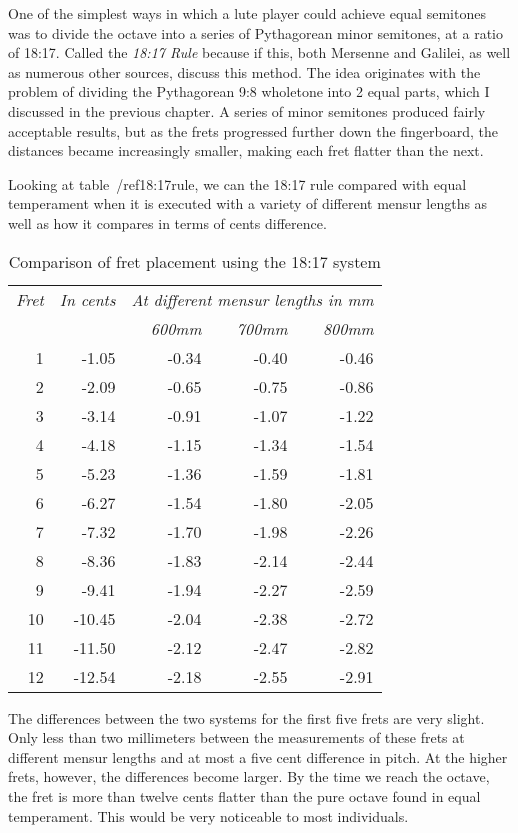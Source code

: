 One of the simplest ways in which a lute player could achieve equal semitones was to
divide the octave into a series of Pythagorean minor semitones, at a ratio of 18:17.
Called the \textit{18:17 Rule} because if this, both Mersenne and Galilei, as well as
numerous other sources, discuss this method.  The idea originates with the problem of
dividing the Pythagorean 9:8 wholetone into 2 equal parts, which I discussed in the
previous chapter.  A series of minor semitones produced fairly acceptable results, but
as the frets progressed further down the fingerboard, the distances became increasingly
smaller, making each fret flatter than the next.

Looking at table~/ref{18:17rule}, we can the 18:17 rule compared with equal temperament
when it is executed with a variety of different mensur lengths as well as how it
compares in terms of cents difference.
\begin{table}[h!]
    \begin{center}
    \begin{tabular}{ r r| r r r }
      \textit{Fret} & \textit{In cents} & \multicolumn{3}{c}{\textit{At different mensur lengths in mm}} \\
       &  & \textit{600mm} & \textit{700mm} & \textit{800mm} \\
      \hline
      1  & -1.05  & -0.34 & -0.40 & -0.46 \\
      2  & -2.09  & -0.65 & -0.75 & -0.86 \\
      3  & -3.14  & -0.91 & -1.07 & -1.22 \\
      4  & -4.18  & -1.15 & -1.34 & -1.54 \\
      5  & -5.23  & -1.36 & -1.59 & -1.81 \\
      6  & -6.27  & -1.54 & -1.80 & -2.05 \\
      7  & -7.32  & -1.70 & -1.98 & -2.26 \\
      8  & -8.36  & -1.83 & -2.14 & -2.44 \\
      9  & -9.41  & -1.94 & -2.27 & -2.59 \\
      10 & -10.45 & -2.04 & -2.38 & -2.72 \\
      11 & -11.50 & -2.12 & -2.47 & -2.82 \\
      12 & -12.54 & -2.18 & -2.55 & -2.91 \\
    \end{tabular}
    \end{center}
    \caption{Comparison of fret placement using the 18:17 system}
    \label{18:17rule}
\end{table}
The differences between the two systems for the first five frets are very slight.  Only
less than two millimeters between the measurements of these frets at different mensur
lengths and at most a five cent difference in pitch.  At the higher frets, however, the
differences become larger.  By the time we reach the octave, the fret is more than
twelve cents flatter than the pure octave found in equal temperament.  This would be
very noticeable to most individuals.

